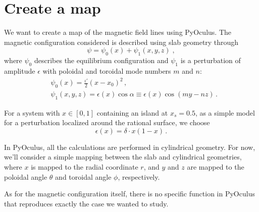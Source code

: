 \section{Create a map}
We want to create a map of the magnetic field lines using PyOculus. The magnetic configuration considered is described using slab geometry through
\begin{equation}
\psi=\psi_0(x)+\psi_1(x,y,z)\;,
\end{equation}
where $\psi_0$ describes the equilibrium configuration and $\psi_1$ is a perturbation of amplitude $\epsilon$ with poloidal and toroidal mode numbers $m$ and $n$:
\begin{align}
&\psi_0(x)=\frac{\iota'}{2}(x-x_0)^2\,,\\
&\psi_1(x,y,z)=\epsilon(x)\cos\alpha\equiv \epsilon(x)\cos(my-nz)\,.
\end{align}

For a system with $x\in[0,1]$ containing an island at $x_s=0.5$, as a simple model for a perturbation localized around the rational surface, we choose
\begin{equation}\label{pert_ampl}
\epsilon(x)=\delta\cdot x(1-x)\,.
\end{equation}

In PyOculus, all the calculations are performed in cylindrical geometry. For now, we'll consider a simple mapping between the slab and cylindrical geometries, where $x$ is mapped to the radial coordinate $r$, and $y$ and $z$ are mapped to the poloidal angle $\theta$ and toroidal angle $\phi$, respectively.

As for the magnetic configuration itself, there is no specific function in PyOculus that reproduces exactly the case we wanted to study.


